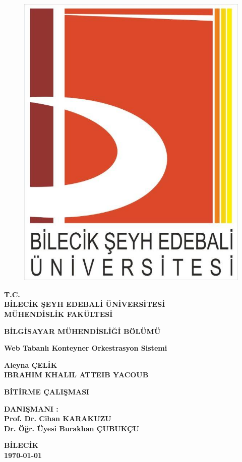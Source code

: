 \thispagestyle{empty}
\begin{figure}[H]
\centering
\includegraphics[scale=0.2]{logomuz}
\end{figure}

\begin{center}
\textbf{T.C.}\\
\textbf{BİLECİK ŞEYH EDEBALİ ÜNİVERSİTESİ}\\
\textbf{MÜHENDİSLİK FAKÜLTESİ}

\textbf{BİLGİSAYAR MÜHENDİSLİĞİ BÖLÜMÜ}
\end{center}
\vfill
\begin{center}
\textbf{Web Tabanlı Konteyner Orkestrasyon Sistemi }

\textbf{Aleyna ÇELİK \\ IBRAHIM KHALIL ATTEIB YACOUB}

\textbf{BİTİRME ÇALIŞMASI}
\end{center}
\vfill
\begin{center}
\textbf{DANIŞMANI :\\ Prof. Dr. Cihan KARAKUZU \\ Dr. Öğr. Üyesi Burakhan ÇUBUKÇU}

\textbf{BİLECİK}\\ 
\textbf{\today}
\end{center}


